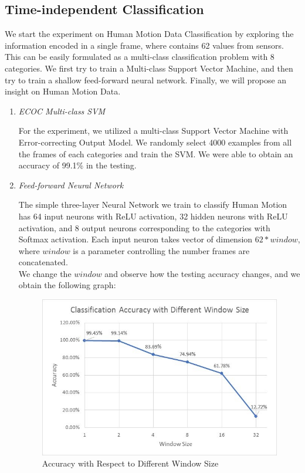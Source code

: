 \documentclass[letterpaper, 10pt, conference]{ieeeconf}
\begin{document}
\subsection{Time-independent Classification}

We start the experiment on Human Motion Data Classification by exploring the information encoded in a single frame, where contains 62 values from sensors. This can be easily formulated as a multi-class classification problem with 8 categories. We first try to train a Multi-class Support Vector Machine, and then try to train a shallow feed-forward neural network. Finally, we will propose an insight on Human Motion Data. 

\begin{enumerate}
\item \textit{ECOC Multi-class SVM}

For the experiment, we utilized a multi-class Support Vector Machine with Error-correcting Output Model. We randomly select 4000 examples from all the frames of each categories and train the SVM. We were able to obtain an accuracy of 99.1\% in the testing. \\

\item \textit{Feed-forward Neural Network}

The simple three-layer Neural Network we train to classify Human Motion has 64 input neurons with ReLU activation, 32 hidden neurons with ReLU activation, and 8 output neurons corresponding to the categories with Softmax activation. Each input neuron takes vector of dimension $62*window$, where $window$ is a parameter controlling the number frames are concatenated. \\

We change the $window$ and observe how the testing accuracy changes, and we obtain the following graph: 

\begin{figure}[h!]
    \centering
    \includegraphics[scale=0.5]{nnac.jpg}
    \caption{Accuracy with Respect to Different Window Size}
\end{figure}


\end{enumerate}
\end{document}
